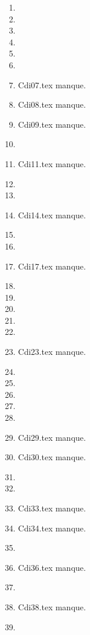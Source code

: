 \clearpage 
{}
\begin{enumerate}
  \item  
  \item  
  \item  
  \item  
  \item  
  \item  
  \item Cdi07.tex manque. 
  \item Cdi08.tex manque. 
  \item Cdi09.tex manque. 
  \item  
  \item Cdi11.tex manque. 
  \item  
  \item  
  \item Cdi14.tex manque. 
  \item  
  \item  
  \item Cdi17.tex manque. 
  \item  
  \item  
  \item  
  \item  
  \item  
  \item Cdi23.tex manque. 
  \item  
  \item  
  \item  
  \item  
  \item  
  \item Cdi29.tex manque. 
  \item Cdi30.tex manque. 
  \item  
  \item  
  \item Cdi33.tex manque. 
  \item Cdi34.tex manque. 
  \item  
  \item Cdi36.tex manque. 
  \item  
  \item Cdi38.tex manque. 
  \item  
\end{enumerate} 
